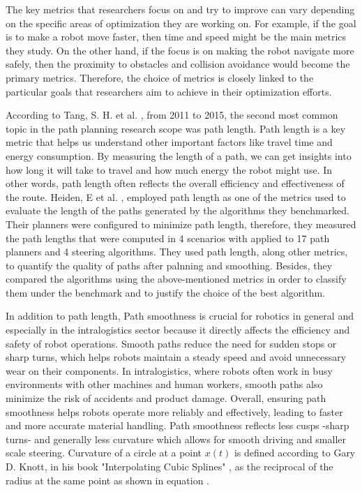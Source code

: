 The key metrics that researchers focus on and try to improve can vary depending on the specific areas of 
optimization they are working on. For example, if the goal is to make a robot move faster, then time 
and speed might be the main metrics they study. On the other hand, if the focus is on making the robot 
navigate more safely, then the proximity to obstacles and collision avoidance would become the primary 
metrics. Therefore, the choice of metrics is closely linked to the particular goals that researchers 
aim to achieve in their optimization efforts.

According to Tang, S. H. et al. \cite{R20}, from 2011 to 2015, the second most common topic in the path 
planning research scope was path length. Path length is a key metric that helps us understand other 
important factors like travel time and energy consumption. By measuring the length of a path, we 
can get insights into how long it will take to travel and how much energy the robot might use. 
In other words, path length often reflects the overall efficiency and effectiveness of the route. 
Heiden, E et al. \cite{R23}, employed path length as one of the metrics used to evaluate the length of 
the paths generated by the algorithms they benchmarked. Their planners 
were configured to minimize path length, therefore, they measured the path lengths that were computed 
in 4 scenarios with applied to 17 path planners and 4 steering algorithms. They used path length,
along other metrics, to quantify the quality of paths after palnning and smoothing.
Besides, they compared the algorithms using the above-mentioned metrics in order to classify them
under the benchmark and to justify the choice of the best algorithm.  

In addition to path length, Path smoothness is crucial for robotics in general and especially 
in the intralogistics sector because it directly affects the efficiency and safety of robot 
operations. Smooth paths reduce the need for sudden stops or sharp turns, which helps robots 
maintain a steady speed and avoid unnecessary wear on their components. In intralogistics, 
where robots often work in busy environments with other machines and human workers, smooth 
paths also minimize the risk of accidents and product damage. Overall, ensuring path 
smoothness helps robots operate more reliably and effectively, leading to faster and 
more accurate material handling. Path smoothness reflects less cusps -sharp turns- and generally
less curvature which allows for smooth driving and smaller scale steering.
Curvature of a circle at a point \(x(t)\) is defined according to Gary D. Knott, in his book 
"Interpolating Cubic Splines" \cite{R34}, as the reciprocal of the radius at the same point as shown in
equation .

